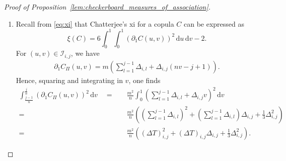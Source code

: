 \documentclass{article}
\theoremstyle{definition}
\newcommand{\II}{\mathcal{I}}  %
\DeclareMathOperator{\tr}{tr}  %
\def\1{\mathds{1}} %
\newcommand{\de}{\mathrm{\,d}}
\begin{document}
\begin{proof}[Proof of Proposition~\ref{lem:checkerboard_measures_of_association}]
\begin{enumerate}[label=(\roman*)]
\begin{align*}
            = \quad & \sum_{i,j=1}^{m,n} \int_{0}^{1}\int_{0}^{1} \left( \sum_{l=1}^{j-1} \Delta_{i,l} + \Delta_{i,j} \1_{\{v\geq 1-u\}} \right) \left(\sum_{k=1}^{i-1} \Delta_{k,j} + \Delta_{i,j} \1_{\{u\geq 1-v\}}\right) \de v \de u \allowdisplaybreaks\\
            = \quad & \sum_{i,j=1}^{m,n} \left(\sum_{k=1}^{i-1} \Delta_{k,j}\sum_{l=1}^{j-1} \Delta_{i,l} + \frac12\sum_{k=1}^{i-1} \Delta_{k,j}\Delta_{i,j} + \frac12\sum_{l=1}^{j-1} \Delta_{i,l} \Delta_{i,j} + \int_0^1\int_0^1 \Delta^2_{i,j}\1_{\{u+v\geq 1\}} \de v \de u \right)\allowdisplaybreaks\\
            = \quad & \sum_{i,j=1}^{m,n} \left(\sum_{k=1}^{i-1} \Delta_{k,j} + \frac12 \Delta_{i,j}\right)\left(\sum_{l=1}^{j-1} \Delta_{i,l} + \frac12 \Delta_{i,j}\right) + \frac14 \sum_{i,j=1}^{m,n} \Delta_{i,j}^2 \\
            = \quad & \frac14\left( \tr\left(\Xi^{(m)} \Delta \Xi^{(n)} \Delta^\top\right) + \tr\left(\Delta^\top \Delta\right)\right)
        ,\end{align*}
        which shows
        \[
            \tau(C_{\searrow}) = 1 - 4\int_{[0,1]^2} \partial_1 C_{\searrow}(u,v)\partial_2 C_{\searrow}(u,v) \de u\de v
            = \tau(C_{\Pi}) - \tr(\Delta^\top \Delta)
        .\]
        \item Recall from \eqref{eq:xi} that Chatterjee's xi for a copula $C$ can be expressed as
        \[
            \xi(C)
            =6 \int_0^1\int_0^1 \left(\partial_1 C(u,v)\right)^2 \de u\de v
            -2
        .\]
        For $(u,v)\in\II_{i,j}$, we have
        \begin{align}\label{eq:partial1_xi}
            \partial_1 C_{\Pi}(u,v) 
            = m\left(\sum_{l=1}^{j-1}\Delta_{i,l} + \Delta_{i,j}(nv-j+1)\right)
        .\end{align}
        Hence, squaring and integrating in $v$, one finds
        \begin{align*}
            \int_{\tfrac{j-1}{n}}^{\tfrac{j}{n}} \left(\partial_1 C_{\Pi}(u,v)\right)^2 \de v
            \quad = \quad & \frac{m^2}{n}\int_0^1 \left(\sum_{l=1}^{j-1}\Delta_{i,l} + \Delta_{i,j} v\right)^2 \de v \\
            = \quad & \frac{m^2}{n}\left(\left(\sum_{l=1}^{j-1}\Delta_{i,l}\right)^2 +\left(\sum_{l=1}^{j-1}\Delta_{i,l}\right)\Delta_{i,j} +\tfrac13\Delta_{i,j}^2 \right) \\
            = \quad & \frac{m^2}{n}\left( (\Delta T)_{i,j}^2
            +\left(\Delta T\right)_{i,j}\Delta_{i,j}
            +\tfrac13\Delta_{i,j}^2 \right).

\end{align*}
\end{enumerate}
\end{proof}
\end{document}
